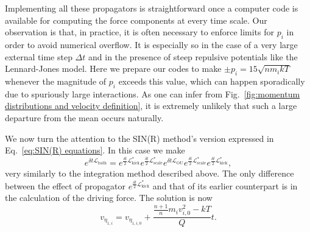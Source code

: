 \documentclass[
aip,
jcp,
reprint,
]{revtex4-1}
\newcommand{\diff}[2]{\frac{\partial #2}{\partial #1}} %
\newcommand{\Liu}{\mathcal{L}}
\newcommand{\nn}{n}
\begin{document}
Implementing all these propagators is straightforward once a computer code is available for computing the force components at every time scale.
Our observation is that, in practice, it is often necessary to enforce limits for $p_i$ in order to avoid numerical overflow.
It is especially so in the case of a very large external time step $\Delta t$ and in the presence of steep repulsive potentials like the Lennard-Jones model.
Here we prepare our codes to make $\pm p_i = 15 \sqrt{n m_i kT}$ whenever the magnitude of $p_i$ exceeds this value, which can happen sporadically due to spuriously large interactions.
As one can infer from Fig.~\ref{fig:momentum distributions and velocity definition}, it is extremely unlikely that such a large departure from the mean occurs naturally.


We now turn the attention to the SIN(R) method's version expressed in Eq.~\eqref{eq:SIN(R) equations}.
In this case we make
\begin{equation*}
e^{\delta t \Liu_\mathrm{bath}} = e^{\frac{\delta t}{2} \mathcal{L}_\mathrm{kick}^\ast} e^{\frac{\delta t}{2} \mathcal{L}_\mathrm{scale}^\ast} e^{\delta t \mathcal{L}_\mathrm{OU}} e^{\frac{\delta t}{2} \mathcal{L}_\mathrm{scale}^\ast} e^{\frac{\delta t}{2} \mathcal{L}_\mathrm{kick}^\ast},
\end{equation*}
very similarly to the integration method described above.
The only difference between the effect of propagator $e^{\frac{\delta t}{2} \mathcal{L}_\mathrm{kick}^\ast}$ and that of its earlier counterpart is in the calculation of the driving force.
The solution is now
\begin{equation*}
v_{\eta_{1,i}} = v_{\eta_{1,i,0}} + \frac{\frac{\nn+1}{\nn} m_i v_{i,0}^2 - kT}{Q} t.
\end{equation*}
\end{document}
